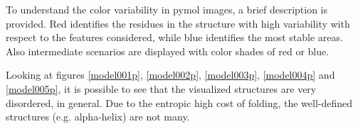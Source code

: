 \medskip
\medskip
To understand the color variability in pymol images, a brief description is provided. Red identifies the residues in the structure with high variability with respect to the features considered, while blue identifies the most stable areas. Also intermediate scenarios are displayed with color shades of red or blue.  

\medskip
Looking at figures \ref{model001p}, \ref{model002p}, \ref{model003p}, \ref{model004p} and \ref{model005p}, it is possible to see that the visualized structures are very disordered, in general. Due to the entropic high cost of folding, the well-defined structures (e.g. alpha-helix) are not many. %
